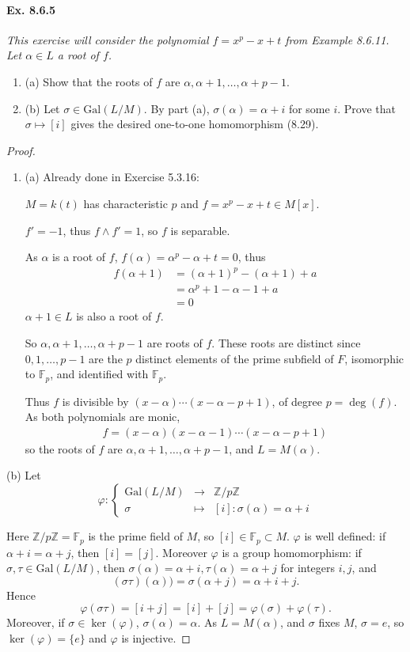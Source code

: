 \documentclass[11pt,a4paper]{article}
\newcommand{\be} {\begin{enumerate}}
\newcommand{\ee} {\end{enumerate}}
\newcommand{\Z}{\mathbb{Z}}
\newcommand{\F}{\mathbb{F}}
\newcommand{\Gal}{\mathrm{Gal}}
\begin{document}
\paragraph{Ex. 8.6.5}

{\it This exercise will consider the polynomial $f = x^p-x+t$ from Example 8.6.11. Let $\alpha \in L$ a root of $f$.
\be
\item[(a)] Show that the roots of $f$ are $\alpha,\alpha+1,\ldots,\alpha+p-1$.
\item[(b)] Let $\sigma \in \Gal(L/M)$. By part (a), $\sigma(\alpha) = \alpha+i$ for some $i$. Prove that $\sigma \mapsto [i]$ gives the desired one-to-one homomorphism (8.29).
\ee
}

\begin{proof}
\be
\item[(a)] Already done in Exercise 5.3.16: 

$M =k(t)$ has characteristic $p$ and  $f = x^p-x+t \in M[x]$.

$f' = -1$, thus $f\wedge f'=1$, so $f$ is separable.

As $\alpha$ is a root of $f$, $f(\alpha) = \alpha^p - \alpha+t =0$, thus
\begin{align*}
f(\alpha+1) &= (\alpha+1)^p - (\alpha+1) +a\\
&= \alpha^p+ 1 -\alpha - 1 +a\\
&=0
\end{align*}
$\alpha+1 \in L$ is also a root of $f$.

 So $\alpha, \alpha+1,\ldots,\alpha+p-1$ are roots of $f$. These roots are distinct since  $0,1,\ldots,p-1$ are the $p$ distinct elements of the prime subfield of  $F$, isomorphic to $\F_p$, and identified with $\F_p$.

 Thus $f$ is divisible by $(x-\alpha)\cdots(x-\alpha- p+1)$, of degree $p = \deg(f)$. As both polynomials are monic,
\begin{align}
f = (x-\alpha)(x-\alpha-1)\cdots(x-\alpha- p+1)
\end{align}
so the roots of $f$ are $\alpha,\alpha+1,\ldots,\alpha+p-1$, and $L = M(\alpha)$.
\ee

\item[(b)]
Let $$\varphi :
\left\{
\begin{array}{ccc}
  \Gal(L/M)& \to   & \Z/p\Z  \\
  \sigma&   \mapsto &  [i] : \sigma(\alpha) = \alpha +i 
\end{array}
\right.
$$

Here $\Z/p\Z = \F_p$ is the prime field of $M$, so $ [i] \in \F_p \subset M$. $\varphi$ is well defined: if $\alpha +i = \alpha +j$, then $[i] = [j]$. Moreover $\varphi$ is a group homomorphism: if $\sigma, \tau \in \Gal(L/M)$, then $\sigma(\alpha) = \alpha + i, \tau(\alpha) = \alpha +j$ for integers $i,j$, and
$$(\sigma \tau)(\alpha)) = \sigma(\alpha +j) = \alpha + i + j .$$
Hence
$$\varphi(\sigma \tau) =[ i+j] = [i]+ [j] = \varphi(\sigma) + \varphi(\tau).$$
Moreover, if $\sigma \in \ker(\varphi)$, $\sigma(\alpha) = \alpha$. As $L = M(\alpha)$, and $\sigma$ fixes $M$, $\sigma = e$, so $\ker(\varphi) = \{e\}$ and $\varphi$ is injective.
\end{proof}
\end{document}

